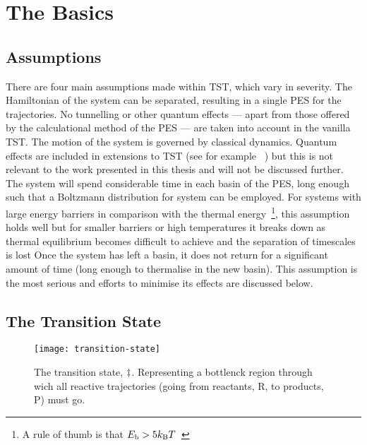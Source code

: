 \section{The Basics}

\subsection{Assumptions}
There are four main assumptions made within TST, which vary in severity.
The Hamiltonian of the system can be separated, resulting in a single PES for the trajectories.
No tunnelling or other quantum effects --- apart from those offered by the calculational method of the PES --- are taken into account in the vanilla TST.
The motion of the system is governed by classical dynamics.
Quantum effects are included in extensions to TST (see for example \cite{qtst-hj-1997, qtst-hj-1998, qtst-hj-2009}~\citemiss) but this is not relevant to the work presented in this thesis and will not be discussed further.
The system will spend considerable time in each basin of the PES, long enough such that a Boltzmann distribution for system can be employed.
For systems with large energy barriers in comparison with the thermal energy~\footnote{A rule of thumb is that $E_\text{b} > 5k_\text{B} T$~\citemiss}, this assumption holds well but for smaller barriers or high temperatures it breaks down as thermal equilibrium becomes difficult to achieve and the separation of timescales is lost
Once the system has left a basin, it does not return for a significant amount of time (long enough to thermalise in the new basin).
This assumption is the most serious and efforts to minimise its effects are discussed below.

\subsection{The Transition State}

\begin{figure}[h]
\begin{center}
\texttt{[image: transition-state]}
    \parbox{0.85\linewidth}{
\caption{The transition state, $\ddagger$.
Representing a bottlenck region through wich all reactive trajectories (going from reactants, R, to products, P) must go.
}
\label{fig:transition-state}
    }
\end{center}
\end{figure}


